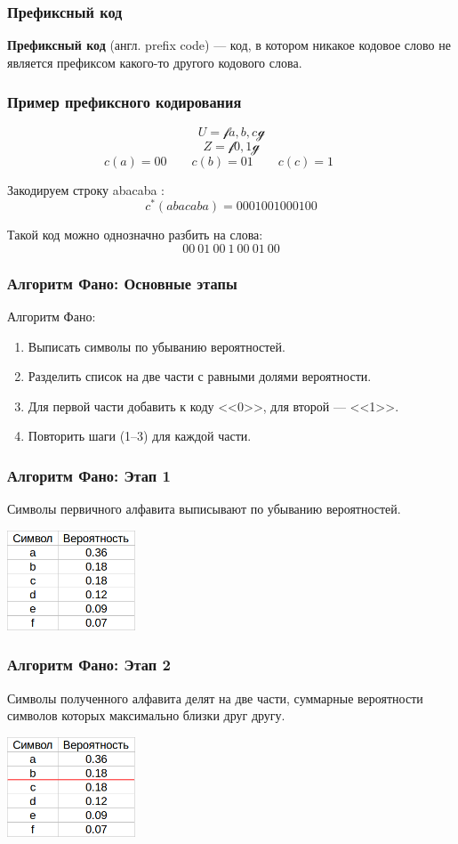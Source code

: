 \documentclass[10pt,pdf,hyperref={unicode}]{beamer}
\begin{document}
\begin{frame}
	\frametitle{Префиксный код}
	\textbf{Префиксный код} (англ. prefix code) --- код, в котором никакое кодовое слово не является префиксом какого-то другого кодового слова.
\end{frame}

\begin{frame}
	\frametitle{Пример префиксного кодирования}
	$$
		U = \mathcal {f} a, b, c \mathcal {g}
	$$$$
		Z = \mathcal {f} 0, 1 \mathcal {g}
	$$$$
		c(a) = 00 \qquad
		c(b) = 01 \qquad
		c(c) = 1 \qquad
	$$

	Закодируем строку abacaba :
	$$
		c^*(abacaba) = 0001001000100
	$$

	Такой код можно однозначно разбить на слова:
	$$
		00\ 01\ 00\ 1\ 00\ 01\ 00
	$$
\end{frame}

\begin{frame}
	\frametitle{Алгоритм Фано: Основные этапы}
	Алгоритм Фано:
	\begin{enumerate}
		\item Выписать символы по убыванию вероятностей.
		\item Разделить список на две части с равными долями вероятности.
		\item Для первой части добавить к коду <<0>>, для второй --- <<1>>.
		\item Повторить шаги (1--3) для каждой части.
	\end{enumerate}
\end{frame}


\begin{frame}
	\frametitle{Алгоритм Фано: Этап 1}
	Символы первичного алфавита выписывают по убыванию вероятностей.
	\newline\newline
	\centerline{\includegraphics[height=8em]{alg0.png}}
\end{frame}

\begin{frame}
	\frametitle{Алгоритм Фано: Этап 2}
	Символы полученного алфавита делят на две части, суммарные вероятности символов которых максимально близки друг другу.
	\newline\newline
	\centerline{\includegraphics[height=8em]{alg1.png}}
\end{frame}
\end{document}
